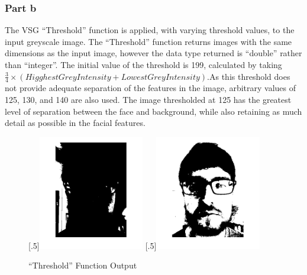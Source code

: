 \documentclass[a4paper]{article}
\begin{document}
	\subsubsection{Part b}
	The VSG ``Threshold'' function is applied, with varying threshold
	values, to the input greyscale image. The ``Threshold'' function returns
	images with the same dimensions as the input image, however the data
	type returned is ``double'' rather than ``integer''. The initial value of the
	threshold is 199, calculated by taking $\frac{3}{4} \times (Higghest
	Grey Intensity + Lowest Grey Intensity)$.As this threshold does not
	provide adequate separation of the features in the image, arbitrary
	values of 125, 130, and 140 are also used. The image thresholded at 125
	has the greatest level of separation between the face and background,
	while also retaining as much detail as possible in the facial features.
	\begin{figure}[H]
		\centering
		[.5\linewidth]{\includegraphics[height=5cm]{Results/Q1/b/qbThreshData.jpg}}%
		[.5\linewidth]{\includegraphics[height=5cm]{Results/Q1/b/qbThresh125.jpg}}%
		\caption{``Threshold'' Function Output}
		\label{fig:}
	\end{figure}
\end{document}
